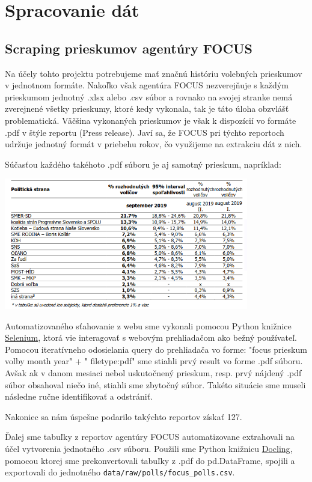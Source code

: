 \documentclass[main.tex]{subfiles}
\begin{document}
\section{Spracovanie dát}

\subsection{Scraping prieskumov agentúry FOCUS}
Na účely tohto projektu potrebujeme mať značnú históriu volebných prieskumov v jednotnom formáte.
Nakoľko však agentúra FOCUS nezverejňuje s každým prieskumom jednotný .xlsx alebo .csv súbor a rovnako na svojej stranke nemá zverejnené všetky prieskumy, ktoré kedy vykonala, tak je táto úloha obzvlášť problematická.
Väčšina vykonaných prieskumov je však k dispozícií vo formáte .pdf v štýle reportu (Press release). Javí sa, že FOCUS pri týchto reportoch udržuje jednotný formát v priebehu rokov, čo využijeme na extrakciu dát z nich.

Súčasťou každého takéhoto .pdf súboru je aj samotný prieskum, napríklad:

\includegraphics[width=0.8\textwidth]{figs/priklad-focus-prieskumu.png}

Automatizovaného sťahovanie z webu sme vykonali pomocou Python knižnice \href{https://github.com/SeleniumHQ/Selenium}{Selenium}, ktorá vie interagovať s webovým prehliadačom ako bežný používateľ. Pomocou iteratívneho odosielania query do prehliadača vo forme: "focus prieskum volby {month} {year}" + " filetype:pdf" sme stiahli prvý result vo forme .pdf súboru. Avšak ak v danom mesiaci nebol uskutočnený prieskum, resp. prvý nájdený .pdf súbor obsahoval niečo iné, stiahli sme zbytočný súbor. Takéto situácie sme museli následne ručne identifikovať a odstrániť. 

Nakoniec sa nám úspešne podarilo takýchto reportov získať 127. 

Ďalej sme tabuľky z reportov agentúry FOCUS automatizovane extrahovali na účel vytvorenia jednotného .csv súboru. Použili sme Python knižnicu \href{https://github.com/DS4SD/docling}{Docling}, pomocou ktorej sme prekonvertovali tabuľky z .pdf do pd.DataFrame, spojili a exportovali do jednotného \verb*|data/raw/polls/focus_polls.csv|.
\end{document}
